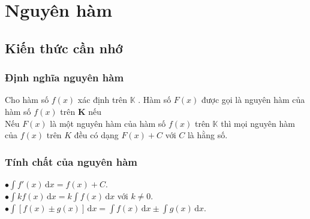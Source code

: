 \section{Nguyên hàm}
\subsection{Kiến thức cần nhớ}
\begin{khung}
\subsubsection{Định nghĩa nguyên hàm}
Cho hàm số $f(x)$ xác định trên $\mathbb{K}$ . Hàm số $F(x)$ được gọi là nguyên hàm của hàm số $f(x)$ trên $\mathbf{K}$ nếu \quad{} \\
Nếu $F(x)$ là một nguyên hàm của hàm số $f(x)$ trên $\mathbb{K}$ thì mọi nguyên hàm của $f(x)$ trên $K$ đều có dạng $F(x)+C$ với $C$ là hằng số.
\subsubsection{Tính chất của nguyên hàm}
$\bullet \displaystyle \int f'(x)\mathrm{\,d}x=f(x)+C$.\\
$\bullet \displaystyle\int k f(x)\mathrm{\,d}x=k\displaystyle\int f(x)\mathrm{\,d}x$ với $k\neq 0$.\\
$\bullet \displaystyle\int[f(x)\pm g(x)]\mathrm{\,d}x=\displaystyle\int f(x)\mathrm{\,d}x\pm\displaystyle\int g(x)\mathrm{\,d}x$.

\end{khung}
